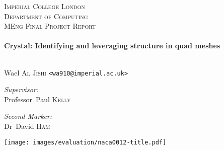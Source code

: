 \begin{titlepage}
\begin{center}

\null
\vspace{0.45cm}

\textsc{\LARGE Imperial College London\\\vspace{0.3 em}Department of Computing}\\[1.5cm]

\textsc{\Large MEng Final Project Report}\\[0.5cm]

\HRule \\[0.4cm]
{ \LARGE \bfseries Crystal: Identifying and leveraging structure in quad meshes \\[0.4cm] }

\HRule \\[0.6cm]


{\large Wael \textsc{Al Jishi} \texttt{<wa910@imperial.ac.uk>}}
\vspace{0.7 cm}

\begin{minipage}{0.4\textwidth}
\begin{flushleft} \large
\emph{Supervisor:} \\
Professor~Paul \textsc{Kelly}
\end{flushleft}
\end{minipage}
\begin{minipage}{0.4\textwidth}
\begin{flushright} \large
\emph{Second Marker:} \\
Dr~David \textsc{Ham}
\end{flushright}
\end{minipage}

\vfill

\centering
\texttt{[image: images/evaluation/naca0012-title.pdf]}

\end{center}
\end{titlepage}
